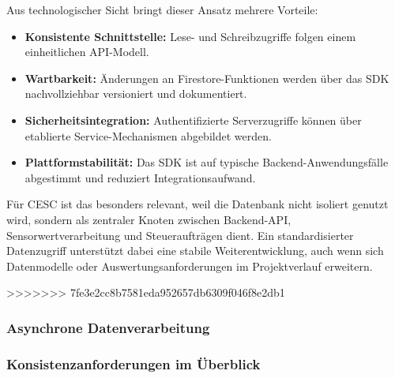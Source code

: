 Aus technologischer Sicht bringt dieser Ansatz mehrere Vorteile:

\begin{itemize}
    \item \textbf{Konsistente Schnittstelle:} Lese- und Schreibzugriffe folgen einem einheitlichen API-Modell.
    \item \textbf{Wartbarkeit:} Änderungen an Firestore-Funktionen werden über das SDK nachvollziehbar versioniert und dokumentiert.
    \item \textbf{Sicherheitsintegration:} Authentifizierte Serverzugriffe können über etablierte Service-Mechanismen abgebildet werden.
    \item \textbf{Plattformstabilität:} Das SDK ist auf typische Backend-Anwendungsfälle abgestimmt und reduziert Integrationsaufwand.
\end{itemize}

Für CESC ist das besonders relevant, weil die Datenbank nicht isoliert genutzt wird, sondern als zentraler Knoten zwischen Backend-API, Sensorwertverarbeitung und Steueraufträgen dient. Ein standardisierter Datenzugriff unterstützt dabei eine stabile Weiterentwicklung, auch wenn sich Datenmodelle oder Auswertungsanforderungen im Projektverlauf erweitern.

>>>>>>> 7fe3e2cc8b7581eda952657db6309f046f8e2db1
\subsubsection{Asynchrone Datenverarbeitung}

\subsubsection{Konsistenzanforderungen im Überblick}
